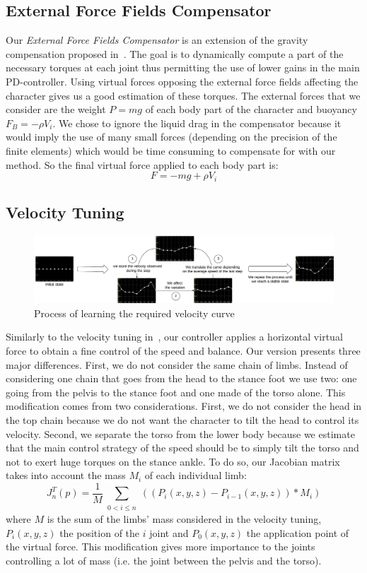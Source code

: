 \documentclass[conference]{acmsiggraph}
\begin{document}
\subsection{External Force Fields Compensator}
\label{sec:ext_force_comp}

Our \textit{External Force Fields Compensator} is an extension of the gravity compensation proposed in~\cite{coros2010generalized}. The goal is to dynamically compute a part of the necessary torques at each joint thus permitting the use of lower gains in the main PD-controller. Using virtual forces opposing the external force fields affecting the character gives us a good estimation of these torques. The external forces that we consider are the weight $P=mg$ of each body part of the character and buoyancy $F_B=-\rho V_i$. We chose to ignore the liquid drag in the compensator because it would imply the use of many small forces (depending on the precision of the finite elements) which would be time consuming to compensate for with our method. So the final virtual force applied to each body part is:
$$
F=-mg+\rho V_i
$$

\subsection{Velocity Tuning}
\label{sec:speed_virt_force}

\begin{figure}[t]
\centering
\includegraphics[scale=0.35]{images/speed_curve_learner.pdf}
\caption{Process of learning the required velocity curve}
\label{fig:speed_curve_learner}
\end{figure}

Similarly to the velocity tuning in~\cite{coros2010generalized}, our controller applies a horizontal virtual force to obtain a fine control of the speed and balance. Our version presents three major differences. First, we do not consider the same chain of limbs. Instead of considering one chain that goes from the head to the stance foot we use two: one going from the pelvis to the stance foot and one made of the torso alone. This modification comes from two considerations. First, we do not consider the head in the top chain because we do not want the character to tilt the head to control its velocity. Second, we separate the torso from the lower body because we estimate that the main control strategy of the speed should be to simply tilt the torso and not to exert huge torques on the stance ankle. To do so, our Jacobian matrix takes into account the mass $M_i$ of each individual limb:
$$
J_n ^T (p)=\frac{1}{M}\sum_{\substack{0<i\leq n}} ((P_i(x,y,z)-P_{i-1}(x,y,z))*M_i)
$$
where $M$ is the sum of the limbs' mass considered in the velocity tuning, $P_i(x,y,z)$ the position of the $i$ joint and $P_0(x,y,z)$ the application point of the virtual force. This modification gives more importance to the joints controlling a lot of mass (i.e. the joint between the pelvis and the torso).
\end{document}
